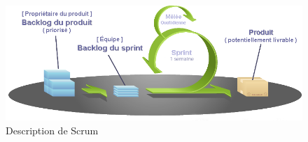 \documentclass[12pt]{report}
\begin{document}
	  \begin{figure}[H]
	    \begin{center}
	      \includegraphics[scale=1.3, width=15cm]{images/logoAgileScrum.png}
	      \caption{Description de Scrum}
	    \end{center}
	  \end{figure}
	  
\end{document}
